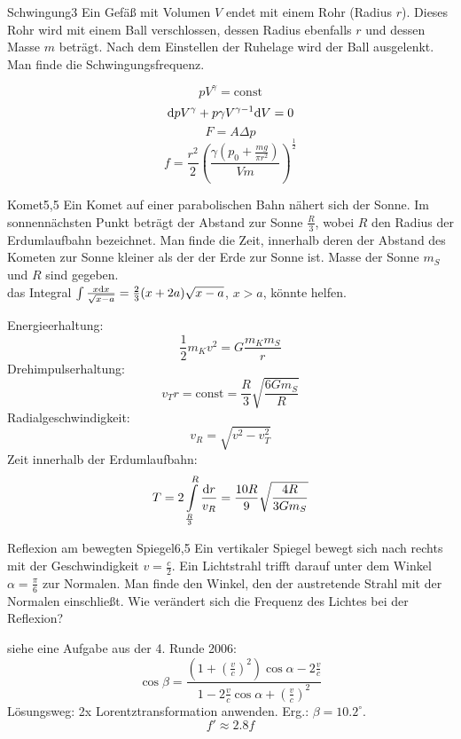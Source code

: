 \begin{problem}{Schwingung}{3}
Ein Gefäß mit Volumen $V$ endet mit einem Rohr (Radius $r$). Dieses Rohr wird mit einem Ball verschlossen, dessen Radius ebenfalls $r$ und dessen Masse $m$ beträgt. Nach dem Einstellen der Ruhelage wird der Ball ausgelenkt. Man finde die Schwingungsfrequenz.
\begin{solution}
\[
pV^\gamma =\mathrm{const}
\]
\[
\mathrm{d} p V^\gamma + p \gamma V^{\gamma-1} \mathrm{d} V=0
\]
\[
F=A \Delta p
\]
\[
f=\frac{r^2}{2}\left( \frac{\gamma (p_0+\frac{mg}{\pi r^2})}{Vm} \right)^{\frac 12}
\]
\end{solution}
\end{problem}

\begin{problem}{Komet}{5,5}
Ein Komet auf einer parabolischen Bahn nähert sich der Sonne. Im sonnennächsten Punkt beträgt der Abstand zur Sonne $\frac R3$, wobei $R$ den Radius der Erdumlaufbahn bezeichnet. Man finde die Zeit, innerhalb deren der Abstand des Kometen zur Sonne kleiner als der der Erde zur Sonne ist. Masse der Sonne $m_S$ und $R$ sind gegeben.\\
\hinweis das Integral $\int \frac{x \mathrm{d} x}{\sqrt{x-a}}=\frac 23 (x+2a) \sqrt{x-a}$, $x>a$, könnte helfen.
\begin{solution}
Energieerhaltung:
\[
\frac 12 m_K v^2=G \frac{m_K m_S}{r}
\]
Drehimpulserhaltung:
\[
v_T r=\mathrm{const}=\frac{R}{3}\sqrt{\frac{6 G m_S}{R}}
\]
Radialgeschwindigkeit:
\[
v_R=\sqrt{v^2-v_T^2}
\]
Zeit innerhalb der Erdumlaufbahn:
\[
T=2 \int\limits_\frac R3^R \frac{\mathrm{d} r}{v_R}=\frac{10 R}{9} \sqrt{\frac{4 R}{3 G m_S}}
\]
\end{solution}
\end{problem}

\begin{problem}{Reflexion am bewegten Spiegel}{6,5}
Ein vertikaler Spiegel bewegt sich nach rechts mit der Geschwindigkeit $v=\frac c2$. Ein Lichtstrahl trifft darauf unter dem Winkel $\alpha=\frac \pi 6$ zur Normalen. Man finde den Winkel, den der austretende Strahl mit der Normalen einschließt. Wie verändert sich die Frequenz des Lichtes bei der Reflexion?
\begin{solution}
siehe eine Aufgabe aus der 4. Runde 2006:
\[
\cos\beta=\frac{(1+(\frac{v}{c})^2)\cos\alpha-2\frac{v}{c}}{1-2\frac{v}{c}\cos\alpha+(\frac{v}{c})^2}
\]
Lösungsweg: 2x Lorentztransformation anwenden. Erg.: $\beta=10.2^\circ$.
\[
f' \approx 2.8 f
\]
\end{solution}
\end{problem}


